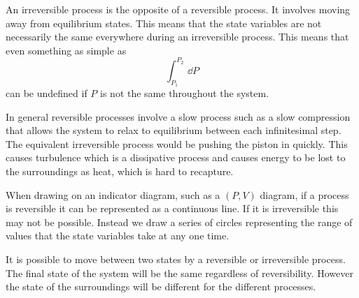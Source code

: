     An irreversible process is the opposite of a reversible process.
    It involves moving away from equilibrium states.
    This means that the state variables are not necessarily the same everywhere during an irreversible process.
    This means that even something as simple as
    \[\int_{P_1}^{P_2}\,\dd{P}\]
    can be undefined if \(P\) is not the same throughout the system.
    
    In general reversible processes involve a slow process such as a slow compression that allows the system to relax to equilibrium between each infinitesimal step.
    The equivalent irreversible process would be pushing the piston in quickly.
    This causes turbulence which is a dissipative process and causes energy to be lost to the surroundings as heat, which is hard to recapture.
    
    When drawing on an indicator diagram, such as a \((P, V)\) diagram, if a process is reversible it can be represented as a continuous line.
    If it is irreversible this may not be possible.
    Instead we draw a series of circles representing the range of values that the state variables take at any one time.
    
    It is possible to move between two states by a reversible or irreversible process.
    The final state of the system will be the same regardless of reversibility.
    However the state of the surroundings will be different for the different processes.
    
